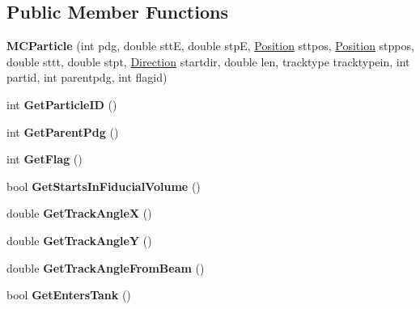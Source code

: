 \subsection*{Public Member Functions}
\begin{DoxyCompactItemize}
\item 
\hypertarget{classMCParticle_a1e2054a5aa6978bec68fa15133e9aae9}{{\bfseries M\-C\-Particle} (int pdg, double stt\-E, double stp\-E, \hyperlink{classPosition}{Position} sttpos, \hyperlink{classPosition}{Position} stppos, double sttt, double stpt, \hyperlink{classDirection}{Direction} startdir, double len, tracktype tracktypein, int partid, int parentpdg, int flagid)}\label{classMCParticle_a1e2054a5aa6978bec68fa15133e9aae9}

\item 
\hypertarget{classMCParticle_a351d384bc2af0918ece85ba38c9551b2}{int {\bfseries Get\-Particle\-I\-D} ()}\label{classMCParticle_a351d384bc2af0918ece85ba38c9551b2}

\item 
\hypertarget{classMCParticle_a05c2ded23b19858448647ce9d2ba36fd}{int {\bfseries Get\-Parent\-Pdg} ()}\label{classMCParticle_a05c2ded23b19858448647ce9d2ba36fd}

\item 
\hypertarget{classMCParticle_a3240caaaac37a2d4ab3ef5d57aa53e74}{int {\bfseries Get\-Flag} ()}\label{classMCParticle_a3240caaaac37a2d4ab3ef5d57aa53e74}

\item 
\hypertarget{classMCParticle_a1829807b49dda47903441234983df064}{bool {\bfseries Get\-Starts\-In\-Fiducial\-Volume} ()}\label{classMCParticle_a1829807b49dda47903441234983df064}

\item 
\hypertarget{classMCParticle_a99c79b20440359ee841296eff1a4ab61}{double {\bfseries Get\-Track\-Angle\-X} ()}\label{classMCParticle_a99c79b20440359ee841296eff1a4ab61}

\item 
\hypertarget{classMCParticle_a98e706fd77669b0461e739b5a8e46998}{double {\bfseries Get\-Track\-Angle\-Y} ()}\label{classMCParticle_a98e706fd77669b0461e739b5a8e46998}

\item 
\hypertarget{classMCParticle_ae5bbdd4456fb3131ec6eb7213cab54cb}{double {\bfseries Get\-Track\-Angle\-From\-Beam} ()}\label{classMCParticle_ae5bbdd4456fb3131ec6eb7213cab54cb}

\item 
\hypertarget{classMCParticle_aa9626a1846b63292b5356fe2be097fe9}{bool {\bfseries Get\-Enters\-Tank} ()}\label{classMCParticle_aa9626a1846b63292b5356fe2be097fe9}


\end{DoxyCompactItemize}
